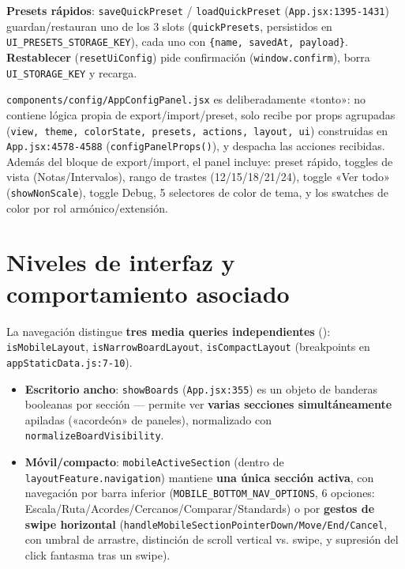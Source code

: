 \documentclass[a4paper,11pt,oneside]{report}
\begin{document}
\textbf{Presets rápidos}: \lstinline!saveQuickPreset! / \lstinline!loadQuickPreset! (\lstinline!App.jsx:1395-1431!) guardan/restauran uno de los 3 slots (\lstinline!quickPresets!, persistidos en \lstinline!UI_PRESETS_STORAGE_KEY!), cada uno con \lstinline!{name, savedAt, payload}!. \textbf{Restablecer} (\lstinline!resetUiConfig!) pide confirmación (\lstinline!window.confirm!), borra \lstinline!UI_STORAGE_KEY! y recarga.

\lstinline!components/config/AppConfigPanel.jsx! es deliberadamente «tonto»: no contiene lógica propia de export/import/preset, solo recibe por props agrupadas (\lstinline!view, theme, colorState, presets, actions, layout, ui!) construidas en \lstinline!App.jsx:4578-4588! (\lstinline!configPanelProps()!), y despacha las acciones recibidas. Además del bloque de export/import, el panel incluye: preset rápido, toggles de vista (Notas/Intervalos), rango de trastes (12/15/18/21/24), toggle «Ver todo» (\lstinline!showNonScale!), toggle Debug, 5 selectores de color de tema, y los swatches de color por rol armónico/extensión.

\chapter{Niveles de interfaz y comportamiento asociado}
\label{sec:13}

La navegación distingue \textbf{tres media queries independientes} (\texttt{}): \lstinline!isMobileLayout!, \lstinline!isNarrowBoardLayout!, \lstinline!isCompactLayout! (breakpoints en \lstinline!appStaticData.js:7-10!).

\begin{itemize}
\item \textbf{Escritorio ancho}: \lstinline!showBoards! (\lstinline!App.jsx:355!) es un objeto de banderas booleanas por sección --- permite ver \textbf{varias secciones simultáneamente} apiladas («acordeón» de paneles), normalizado con \lstinline!normalizeBoardVisibility!.
\item \textbf{Móvil/compacto}: \lstinline!mobileActiveSection! (dentro de \lstinline!layoutFeature.navigation!) mantiene \textbf{una única sección activa}, con navegación por barra inferior (\lstinline!MOBILE_BOTTOM_NAV_OPTIONS!, 6 opciones: Escala/Ruta/Acordes/Cercanos/Comparar/Standards) o por \textbf{gestos de swipe horizontal} (\lstinline!handleMobileSectionPointerDown/Move/End/Cancel!, con umbral de arrastre, distinción de scroll vertical vs. swipe, y supresión del click fantasma tras un swipe).
\end{itemize}
\end{document}

